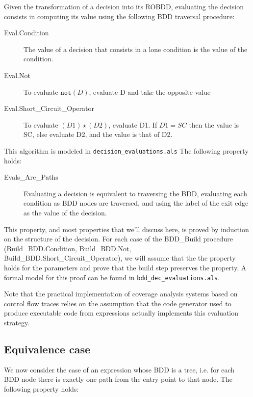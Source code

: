 \documentclass[a4paper,12pt,twoside]{article}
\newcommand{\anysc}{\star}
\newcommand{\adanot}{\texttt{not}}
\newcommand{\alloyspec}[1]{\texttt{#1}}
\begin{document}
Given the transformation of a decision into its ROBDD, evaluating the
decision consists in computing its value using the following BDD traversal
procedure:

\begin{description}
\item[Eval.Condition]
  The value of a decision that consists in a lone condition is the
  value of the condition.

\item[Eval.Not]
  To evaluate $\adanot{} (D)$, evaluate D and take the opposite value

\item[Eval.Short\_Circuit\_Operator]
  To evaluate $(D1) \anysc{} (D2)$, evaluate D1. If $D1 = SC$ then the
  value is SC, else evaluate D2, and the value is that of D2.
\end{description}

This algorithm is modeled in \alloyspec{decision\_evaluations.als}
The following property holds:

\begin{description}
\item[Evals\_Are\_Paths]
  Evaluating a decision is equivalent to traversing the BDD, evaluating
  each condition as BDD nodes are traversed, and using the label of the
  exit edge as the value of the decision.
\end{description}

This property, and most properties that we'll discuss here, is proved
by induction on the structure of the decision.  For each case of the
BDD\_Build procedure (Build\_BDD.Condition, Build\_BDD.Not,
Build\_BDD.Short\_Circuit\_Operator), we will assume that the the
property holds for the parameters and prove that the build step
preserves the property. A formal model for this proof can be found
in \alloyspec{bdd\_dec\_evaluations.als}.

Note that the practical implementation of coverage analysis systems based
on control flow traces relies on the assumption that the code generator
used to produce executable code from expressions actually implements this
evaluation strategy.

\subsection{Equivalence case}

We now consider the case of an expression whose BDD is a tree,
i.e. for each BDD node there is exactly one path from the entry point to
that node. The following property holds:
\end{document}
